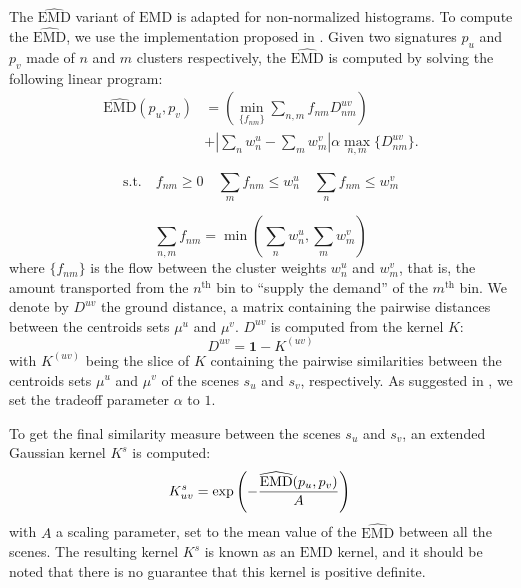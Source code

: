 \documentclass[journal]{IEEEtran}
\newcommand*{\EMD}{\mathrm{EMD}}
\newcommand{\ja}[1]{\textcolor{magenta}{Joakim : #1}}
\begin{document}
The $\widehat{\EMD}$ variant of $\EMD$ is adapted for non-normalized histograms. To compute the $\widehat{\EMD}$, we use the implementation proposed in \cite{pele2009fast}. Given two signatures $p_u$ and $p_v$ made of $n$ and $m$ clusters respectively, the $\widehat{\EMD}$ is computed by solving the following linear program:
\begin{equation}
\begin{split}
\widehat{\EMD}(p_u,p_v) &=\left( \min\limits_{\lbrace f_{nm}\rbrace} \sum\limits_{n,m} f_{nm}D_{nm}^{uv} \right) \\
&+ \left|\sum\limits_{n} w_n^u - \sum\limits_{m} w_m^v  \right| \alpha \max\limits_{n,m}\lbrace  D_{nm}^{uv}\rbrace.
\end{split}
\end{equation}

\begin{equation*}
\mathrm{s.t.} \quad f_{nm}\geq0 \quad \sum\limits_{m} f_{nm} \leq w_n^u \quad \sum\limits_{n} f_{nm} \leq w_m^v
\end{equation*}

\begin{equation*}
\sum\limits_{n,m}f_{nm} = \min\left( \sum\limits_{n} w_n^u ,\sum\limits_{m} w_m^v \right)
\end{equation*} 
where $\lbrace f_{nm} \rbrace$ is the flow between the cluster weights $w_n^u$ and $w_m^v$, that is, the amount transported from the $n^{\textrm{th}}$ bin to ``supply the demand'' of the $m^\textrm{th}$ bin. We denote by $D^{uv}$ the ground distance, a matrix containing the pairwise distances between the centroids sets $\mu^u$ and $\mu^v$. $D^{uv}$ is computed from the kernel $K$:
\begin{equation*}
D^{uv}=\boldsymbol{1}-K^{(uv)}
\end{equation*}
with $K^{(uv)}$ being the slice of $K$ containing the pairwise similarities between the centroids sets $\mu^u$ and $\mu^v$ of the scenes $s_u$ and $s_v$, respectively. As suggested in \cite{pele2009fast}, we set the tradeoff parameter $\alpha$ to $1$.

To get the final similarity measure between the scenes $s_u$ and $s_v$, an extended Gaussian kernel $K^s$ is computed: %
\begin{equation}
\label{eq:ks}
K_{uv}^s = \exp\left( - \dfrac{\widehat{\EMD}(p_u,p_v)}{A} \right) \\
\end{equation}
with $A$ a scaling parameter, set to the mean value of the $\widehat{\EMD}$ between all the scenes. The resulting kernel $K^s$ is known as an $\EMD$ kernel, and it should be noted that there is no guarantee that this kernel is positive definite.
\end{document}
